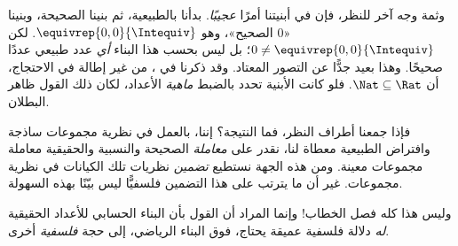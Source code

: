 \documentclass[../../../include/open-logic-section]{subfiles}
\begin{document}
وثمة وجه آخر للنظر، فإن في أبنيتنا أمرًا \emph{عجيبًا}. بدأنا بالطبيعية، ثم بنينا الصحيحة، وبنينا «$0$ الصحيح»، وهو $ \equivrep{0,0}{\Intequiv}$. لكن $0 \neq
\equivrep{0,0}{\Intequiv}$؛ بل ليس بحسب هذا البناء \emph{أي} عدد طبيعي عددًا صحيحًا. وهذا بعيد جدًّا عن التصور المعتاد. وقد ذكرنا في ، من غير إطالة في الاحتجاج، أن $\Nat \subseteq \Rat$. فلو كانت الأبنية تحدد بالضبط \emph{ماهية} الأعداد، لكان ذلك القول ظاهر البطلان.

فإذا جمعنا أطراف النظر، فما النتيجة؟ إننا، بالعمل في نظرية مجموعات ساذجة وافتراض الطبيعية معطاة لنا، نقدر على \emph{معاملة} الصحيحة والنسبية والحقيقية معاملة مجموعات معينة. ومن هذه الجهة نستطيع \emph{تضمين} نظريات تلك الكيانات في نظرية مجموعات. غير أن ما يترتب على هذا التضمين فلسفيًّا ليس بيّنًا بهذه السهولة.

وليس هذا كله فصل الخطاب!{} وإنما المراد أن القول بأن البناء الحسابي للأعداد الحقيقية \emph{له} دلالة فلسفية عميقة يحتاج، فوق البناء الرياضي، إلى حجة \emph{فلسفية} أخرى.

\end{document}
